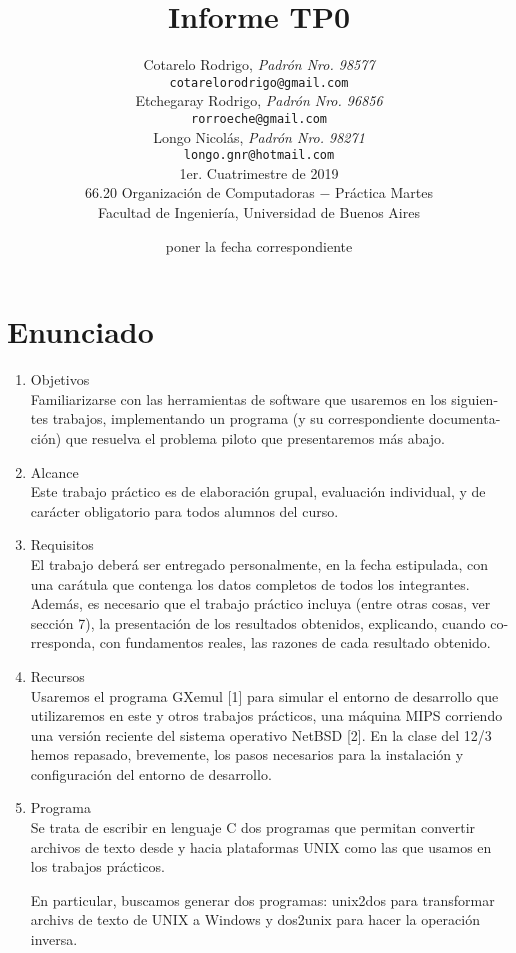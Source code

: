 \documentclass[a4paper,11pt]{article}
\title{		\textbf{Informe TP0}}
\author{	Cotarelo Rodrigo, \textit{Padrón Nro. 98577}                     \\
            \texttt{ cotarelorodrigo@gmail.com }                                              \\[2.5ex]
            Etchegaray Rodrigo, \textit{Padrón Nro. 96856}                     \\
            \texttt{ rorroeche@gmail.com }                                              \\[2.5ex]
			Longo Nicolás, \textit{Padrón Nro. 98271}                    
\\
            \texttt{ longo.gnr@hotmail.com }                                              \\[2.5ex]
            \normalsize{1er. Cuatrimestre de 2019}                                      \\
            \normalsize{66.20 Organización de Computadoras  $-$ Práctica Martes}  \\
            \normalsize{Facultad de Ingeniería, Universidad de Buenos Aires}            \\
       }
\date{poner la fecha correspondiente}
\begin{document}
\maketitle
\thispagestyle{empty}   %
\newpage

\section{Enunciado}

\begin{enumerate}
\item Objetivos \\
Familiarizarse con las herramientas de software que usaremos en los siguien-
tes trabajos, implementando un programa (y su correspondiente documenta-
ción) que resuelva el problema piloto que presentaremos más abajo.

\item Alcance \\
Este trabajo práctico es de elaboración grupal, evaluación individual, y de
carácter obligatorio para todos alumnos del curso.

\item Requisitos \\
El trabajo deberá ser entregado personalmente, en la fecha estipulada, con
una carátula que contenga los datos completos de todos los integrantes.
Además, es necesario que el trabajo práctico incluya (entre otras cosas, ver
sección 7), la presentación de los resultados obtenidos, explicando, cuando co-
rresponda, con fundamentos reales, las razones de cada resultado obtenido.

\item Recursos \\
Usaremos el programa GXemul [1] para simular el entorno de desarrollo que
utilizaremos en este y otros trabajos prácticos, una máquina MIPS corriendo
una versión reciente del sistema operativo NetBSD [2].
En la clase del 12/3 hemos repasado, brevemente, los pasos necesarios para
la instalación y configuración del entorno de desarrollo.

\item Programa \\
Se trata de escribir en lenguaje C dos programas que permitan convertir
archivos de texto desde y hacia plataformas UNIX como las que usamos en los
trabajos prácticos. 


\indent
En particular, buscamos generar dos programas: unix2dos para transformar archivs de texto de UNIX a Windows y dos2unix para hacer la operación inversa.



\end{enumerate}
\end{document}
